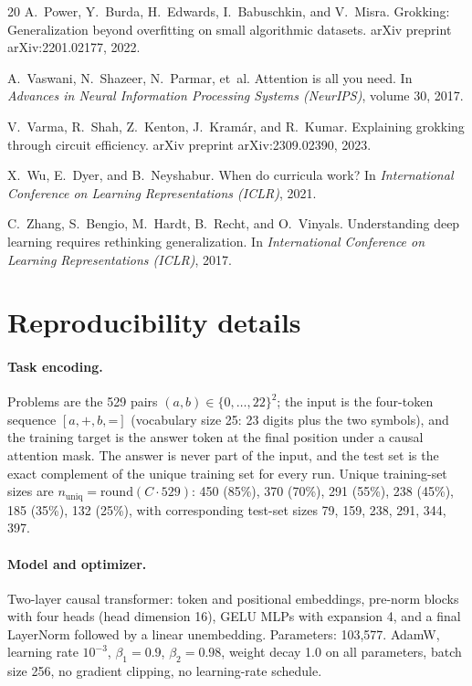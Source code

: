 \documentclass[10pt]{article}
\newcommand{\coverage}{C}
\begin{document}
\begin{thebibliography}{20}
A.~Power, Y.~Burda, H.~Edwards, I.~Babuschkin, and V.~Misra.
\newblock Grokking: Generalization beyond overfitting on small algorithmic datasets.
\newblock arXiv preprint arXiv:2201.02177, 2022.

A.~Vaswani, N.~Shazeer, N.~Parmar, et~al.
\newblock Attention is all you need.
\newblock In \emph{Advances in Neural Information Processing Systems (NeurIPS)}, volume 30, 2017.

V.~Varma, R.~Shah, Z.~Kenton, J.~Kram\'{a}r, and R.~Kumar.
\newblock Explaining grokking through circuit efficiency.
\newblock arXiv preprint arXiv:2309.02390, 2023.

X.~Wu, E.~Dyer, and B.~Neyshabur.
\newblock When do curricula work?
\newblock In \emph{International Conference on Learning Representations (ICLR)}, 2021.

C.~Zhang, S.~Bengio, M.~Hardt, B.~Recht, and O.~Vinyals.
\newblock Understanding deep learning requires rethinking generalization.
\newblock In \emph{International Conference on Learning Representations (ICLR)}, 2017.

\end{thebibliography}

\appendix

\section{Reproducibility details}
\label{app:repro}

\paragraph{Task encoding.}
Problems are the 529 pairs $(a,b) \in \{0,\dots,22\}^2$; the input is the four-token sequence $[a, \texttt{+}, b, \texttt{=}]$ (vocabulary size 25: 23 digits plus the two symbols), and the training target is the answer token at the final position under a causal attention mask. The answer is never part of the input, and the test set is the exact complement of the unique training set for every run. Unique training-set sizes are $n_{\mathrm{uniq}} = \mathrm{round}(\coverage \cdot 529)$: 450 (85\%), 370 (70\%), 291 (55\%), 238 (45\%), 185 (35\%), 132 (25\%), with corresponding test-set sizes 79, 159, 238, 291, 344, 397.

\paragraph{Model and optimizer.}
Two-layer causal transformer: token and positional embeddings, pre-norm blocks with four heads (head dimension 16), GELU MLPs with expansion 4, and a final LayerNorm followed by a linear unembedding. Parameters: 103{,}577. AdamW, learning rate $10^{-3}$, $\beta_1 = 0.9$, $\beta_2 = 0.98$, weight decay 1.0 on all parameters, batch size 256, no gradient clipping, no learning-rate schedule.
\end{document}
